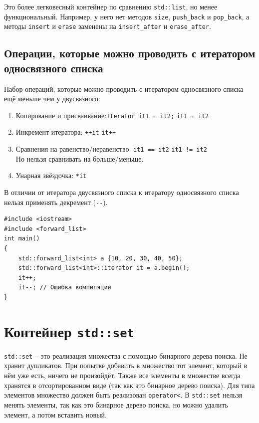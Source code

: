 \documentclass{article}
\begin{document}
Это более легковесный контейнер по сравнению \texttt{std::list}, но менее функциональный.
Например, у него нет методов \texttt{size}, \texttt{push\_back} и \texttt{pop\_back}, а методы \texttt{insert} и \texttt{erase} заменены на \texttt{insert\_after} и \texttt{erase\_after}.


\subsection*{Операции, которые можно проводить с итератором односвязного списка}
Набор операций, которые можно проводить с итератором односвязного списка ещё меньше чем у двусвязного:
\begin{enumerate}
\item Копирование и присваивание:\quad \texttt{Iterator it1 = it2;} \quad \texttt{it1 = it2}
\item Инкремент итератора: \quad \texttt{++it} \quad \texttt{it++}
\item Сравнения на равенство/неравенство:  \quad\texttt{it1 == it2} \quad  \texttt{it1 != it2}\\
Но нельзя сравнивать на больше/меньше.
\item Унарная звёздочка: \quad \texttt{*it}
\end{enumerate} 
В отличии от итератора двусвязного списка к итератору односвязного списка нельзя применять декремент (\texttt{-{}-}).
\begin{lstlisting}
#include <iostream>
#include <forward_list>
int main()
{
    std::forward_list<int> a {10, 20, 30, 40, 50};
    std::forward_list<int>::iterator it = a.begin();
    it++;
    it--; // Ошибка компиляции
}
\end{lstlisting}

\newpage
\section*{Контейнер \texttt{std::set}}
\texttt{std::set} -- это реализация множества с помощью бинарного дерева поиска. Не хранит дупликатов. При попытке добавить в множество тот элемент, который в нём уже есть, ничего не произойдёт. Также все элементы в множестве всегда хранятся в отсортированном виде (так как это бинарное дерево поиска). Для типа элементов множество должен быть реализован \texttt{operator<}. В \texttt{std::set} нельзя менять элементы, так как это бинарное дерево поиска, но можно удалить элемент, а потом вставить новый.\\
\end{document}
